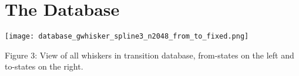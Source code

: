 \section*{The Database}

\begin{center}
\texttt{[image: database\_gwhisker\_spline3\_n2048\_from\_to\_fixed.png]}
\label{fig:database}

Figure 3: View of all whiskers in transition database, from-states on the left and to-states on the right.
\end{center}
